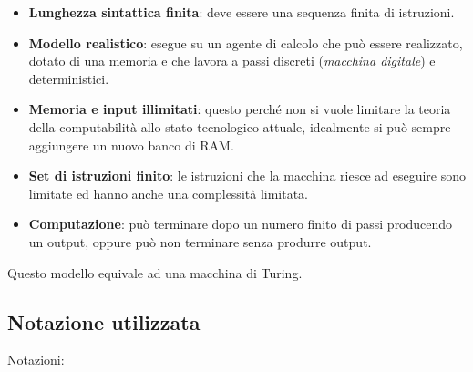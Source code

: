 \begin{itemize}
\item
  \textbf{Lunghezza sintattica finita}: deve essere una sequenza finita
  di istruzioni.
\item
  \textbf{Modello realistico}: esegue su un agente di calcolo che può
  essere realizzato, dotato di una memoria e che lavora a passi discreti
  (\emph{macchina digitale}) e deterministici.
\item
  \textbf{Memoria e input illimitati}: questo perché non si vuole
  limitare la teoria della computabilità allo stato tecnologico attuale,
  idealmente si può sempre aggiungere un nuovo banco di RAM.
\item
  \textbf{Set di istruzioni finito}: le istruzioni che la macchina
  riesce ad eseguire sono limitate ed hanno anche una complessità
  limitata.
\item
  \textbf{Computazione}: può terminare dopo un numero finito di passi
  producendo un output, oppure può non terminare senza produrre output.
\end{itemize}

Questo modello equivale ad una macchina di Turing.

\subsection{Notazione utilizzata}\label{notazione-utilizzata}

Notazioni:


